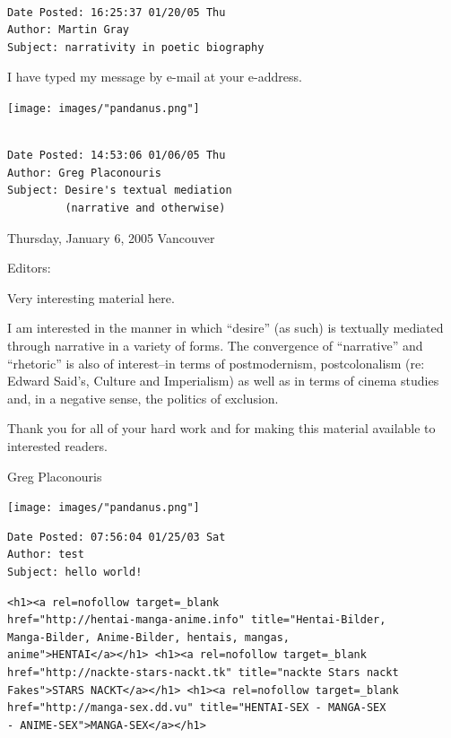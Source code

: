 \documentclass[
]{memoir}
\begin{document}
\begin{verbatim}

Date Posted: 16:25:37 01/20/05 Thu
Author: Martin Gray
Subject: narrativity in poetic biography
\end{verbatim}

I have typed my message by e-mail at your e-address.

\begin{center}\texttt{[image: images/"pandanus.png"]}\end{center}

\begin{verbatim}

Date Posted: 14:53:06 01/06/05 Thu
Author: Greg Placonouris
Subject: Desire's textual mediation 
         (narrative and otherwise)
\end{verbatim}

Thursday, January 6, 2005 Vancouver

Editors:

Very interesting material here.

I am interested in the manner in which ``desire'' (as such) is textually
mediated through narrative in a variety of forms. The convergence of
``narrative'' and ``rhetoric'' is also of interest--in terms of
postmodernism, postcolonalism (re: Edward Said's, Culture and
Imperialism) as well as in terms of cinema studies and, in a negative
sense, the politics of exclusion.

Thank you for all of your hard work and for making this material
available to interested readers.

Greg Placonouris

\begin{center}\texttt{[image: images/"pandanus.png"]}\end{center}

\begin{verbatim}
Date Posted: 07:56:04 01/25/03 Sat
Author: test
Subject: hello world!
\end{verbatim}

\begin{verbatim}
<h1><a rel=nofollow target=_blank
href="http://hentai-manga-anime.info" title="Hentai-Bilder,
Manga-Bilder, Anime-Bilder, hentais, mangas,
anime">HENTAI</a></h1> <h1><a rel=nofollow target=_blank
href="http://nackte-stars-nackt.tk" title="nackte Stars nackt
Fakes">STARS NACKT</a></h1> <h1><a rel=nofollow target=_blank
href="http://manga-sex.dd.vu" title="HENTAI-SEX - MANGA-SEX
- ANIME-SEX">MANGA-SEX</a></h1> 
\end{verbatim}

\end{document}
